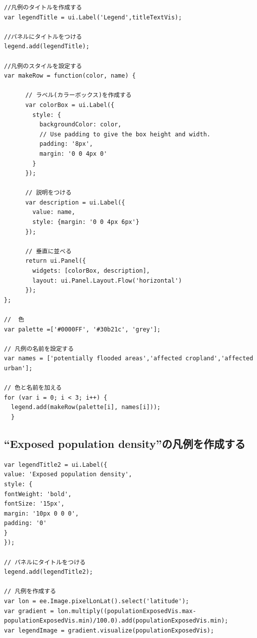 \documentclass[
]{book}
\begin{document}
\begin{verbatim}
//凡例のタイトルを作成する
var legendTitle = ui.Label('Legend',titleTextVis);

//パネルにタイトルをつける
legend.add(legendTitle);

//凡例のスタイルを設定する
var makeRow = function(color, name) {
 
      // ラベル(カラーボックス)を作成する
      var colorBox = ui.Label({
        style: {
          backgroundColor: color,
          // Use padding to give the box height and width.
          padding: '8px',
          margin: '0 0 4px 0'
        }
      });
 
      // 説明をつける
      var description = ui.Label({
        value: name,
        style: {margin: '0 0 4px 6px'}
      });
 
      // 垂直に並べる
      return ui.Panel({
        widgets: [colorBox, description],
        layout: ui.Panel.Layout.Flow('horizontal')
      });
};

//  色
var palette =['#0000FF', '#30b21c', 'grey'];
 
// 凡例の名前を設定する
var names = ['potentially flooded areas','affected cropland','affected urban'];
 
// 色と名前を加える
for (var i = 0; i < 3; i++) {
  legend.add(makeRow(palette[i], names[i]));
  }  
\end{verbatim}

\hypertarget{exposed-population-densityux306eux51e1ux4f8bux3092ux4f5cux6210ux3059ux308b}{%
\subsection{``Exposed population density''の凡例を作成する}\label{exposed-population-densityux306eux51e1ux4f8bux3092ux4f5cux6210ux3059ux308b}}

\begin{verbatim}
var legendTitle2 = ui.Label({
value: 'Exposed population density',
style: {
fontWeight: 'bold',
fontSize: '15px',
margin: '10px 0 0 0',
padding: '0'
}
});

// パネルにタイトルをつける
legend.add(legendTitle2);

// 凡例を作成する
var lon = ee.Image.pixelLonLat().select('latitude');
var gradient = lon.multiply((populationExposedVis.max-populationExposedVis.min)/100.0).add(populationExposedVis.min);
var legendImage = gradient.visualize(populationExposedVis);
\end{verbatim}
\end{document}

